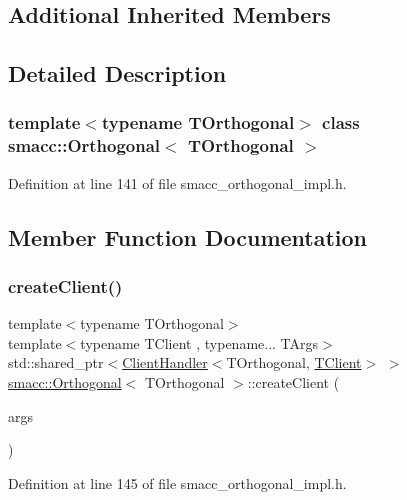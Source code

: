 \subsection*{Additional Inherited Members}


\subsection{Detailed Description}
\subsubsection*{template$<$typename T\+Orthogonal$>$\newline
class smacc\+::\+Orthogonal$<$ T\+Orthogonal $>$}



Definition at line 141 of file smacc\+\_\+orthogonal\+\_\+impl.\+h.



\subsection{Member Function Documentation}
\mbox{\label{classsmacc_1_1Orthogonal_aea19bfe584fe9c9580784a24b4690eab}} 
\subsubsection{\texorpdfstring{create\+Client()}{createClient()}}
{\footnotesize\ttfamily template$<$typename T\+Orthogonal$>$ \\
template$<$typename T\+Client , typename... T\+Args$>$ \\
std\+::shared\+\_\+ptr$<$\hyperlink{classsmacc_1_1ClientHandler}{Client\+Handler}$<$T\+Orthogonal, \hyperlink{classTClient}{T\+Client}$>$ $>$ \hyperlink{classsmacc_1_1Orthogonal}{smacc\+::\+Orthogonal}$<$ T\+Orthogonal $>$\+::create\+Client (\begin{DoxyParamCaption}\item[{T\+Args...}]{args }\end{DoxyParamCaption})\hspace{0.3cm}{\ttfamily [inline]}}



Definition at line 145 of file smacc\+\_\+orthogonal\+\_\+impl.\+h.


